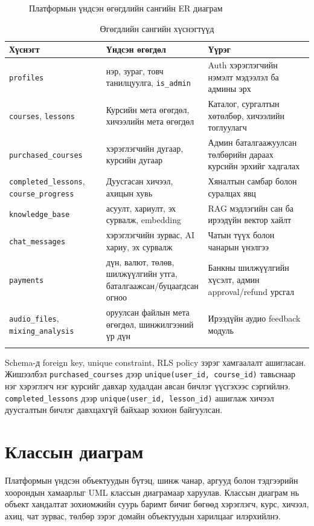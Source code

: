 \begin{figure}[H]
  \centering
  \resizebox{\textwidth}{!}{}
  \caption[Өгөгдлийн сангийн ER диаграм]{Платформын үндсэн өгөгдлийн сангийн ER диаграм}
  \label{fig:ch3-er}
\end{figure}

\begin{longtable}{|p{}|p{}|p{}|}
  \hline
  \textbf{Хүснэгт} & \textbf{Үндсэн өгөгдөл} & \textbf{Үүрэг} \\ \hline
  \texttt{profiles} & нэр, зураг, товч танилцуулга, \texttt{is\_admin} & Auth хэрэглэгчийн нэмэлт мэдээлэл ба админы эрх \\ \hline
  \texttt{courses}, \texttt{lessons} & Курсийн мета өгөгдөл, хичээлийн мета өгөгдөл & Каталог, сургалтын хөтөлбөр, хичээлийн тоглуулагч \\ \hline
  \texttt{purchased\_courses} & хэрэглэгчийн дугаар, курсийн дугаар & Админ баталгаажуулсан төлбөрийн дараах курсийн эрхийг хадгалах \\ \hline
  \texttt{completed\_lessons}, \texttt{course\_progress} & Дуусгасан хичээл, ахицын хувь & Хяналтын самбар болон суралцах явц \\ \hline
  \texttt{knowledge\_base} & асуулт, хариулт, эх сурвалж, embedding & RAG мэдлэгийн сан ба ирээдүйн вектор хайлт \\ \hline
  \texttt{chat\_messages} & хэрэглэгчийн зурвас, AI хариу, эх сурвалж & Чатын түүх болон чанарын үнэлгээ \\ \hline
  \texttt{payments} & дүн, валют, төлөв, шилжүүлгийн утга, баталгаажсан/буцаагдсан огноо & Банкны шилжүүлгийн хүсэлт, админ approval/refund урсгал \\ \hline
  \texttt{audio\_files}, \texttt{mixing\_analysis} & оруулсан файлын мета өгөгдөл, шинжилгээний үр дүн & Ирээдүйн аудио feedback модуль \\ \hline
  \caption{Өгөгдлийн сангийн хүснэгтүүд}
  \label{tab:ch3-db-tables}
\end{longtable}

Schema-д foreign key, unique constraint, RLS policy зэрэг хамгаалалт ашигласан. Жишээлбэл \texttt{purchased\_courses} дээр \texttt{unique(user\_id, course\_id)} тавьснаар нэг хэрэглэгч нэг курсийг давхар худалдан авсан бичлэг үүсгэхээс сэргийлнэ. \texttt{completed\_lessons} дээр \texttt{unique(user\_id, lesson\_id)} ашиглаж хичээл дуусгалтын бичлэг давхцахгүй байхаар зохион байгуулсан.

\section{Классын диаграм}
Платформын үндсэн объектуудын бүтэц, шинж чанар, аргууд болон тэдгээрийн хоорондын хамаарлыг UML классын диаграмаар харуулав. Классын диаграм нь объект хандалтат зохиомжийн суурь баримт бичиг бөгөөд хэрэглэгч, курс, хичээл, ахиц, чат зурвас, төлбөр зэрэг домайн объектуудын харилцааг илэрхийлнэ.

